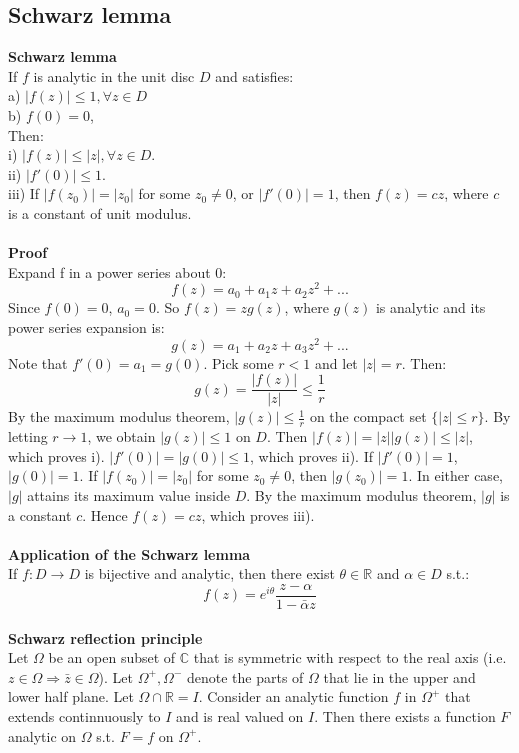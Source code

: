 \documentclass[12 pt]{article}
\begin{document}
\subsection{Schwarz lemma}

\textbf{Schwarz lemma}
\\
If $f$ is analytic in the unit disc $D$ and satisfies:
\\
a) $|f(z)|\leq 1, \forall z\in D$
\\
b) $f(0) = 0$,
\\
Then:
\\
i) $|f(z)|\leq |z|, \forall z\in D$.
\\
ii) $|f'(0)|\leq 1$.
\\
iii) If $|f(z_0)| = |z_0|$ for some $z_0\neq 0$, or $|f'(0)| = 1$, then $f(z)=cz$, where $c$ is a constant of unit modulus.
\\
\\
\textbf{Proof}
\\
Expand f in a power series about 0:
\[ f(z) = a_0 + a_1 z + a_2 z^2 + ... \]
Since $f(0)=0$, $a_0=0$. So $f(z) = z g(z)$, where $g(z)$ is analytic and its power series expansion is:
\[ g(z) = a_1 + a_2 z + a_3 z^2 + ... \]
Note that $f'(0) = a_1 = g(0)$. Pick some $r< 1$ and let $|z| = r$. Then:
\[ g(z) = \frac{|f(z)|}{|z|} \leq \frac{1}{r} \]
By the maximum modulus theorem, $|g(z)| \leq \frac{1}{r}$ on the compact set $\{|z|\leq r\}$. By letting $r\to 1$, we obtain $|g(z)| \leq 1$ on $D$. Then $|f(z)| = |z||g(z)| \leq |z|$, which proves i). $|f'(0)| = |g(0)| \leq 1$, which proves ii). If $|f'(0)| = 1$, $|g(0)| = 1$. If $|f(z_0)| = |z_0|$ for some $z_0 \neq 0$, then $|g(z_0)| = 1$. In either case, $|g|$ attains its maximum value inside $D$. By the maximum modulus theorem, $|g|$ is a constant $c$. Hence $f(z) = cz$, which proves iii).
\\
\\
\textbf{Application of the Schwarz lemma}
\\
If $f:D\to D$ is bijective and analytic, then there exist $\theta \in \mathbb{R}$ and $\alpha \in D$ s.t.:
\[ f(z) = e^{i\theta} \frac{z-\alpha}{1-\bar \alpha z} \]
\\
\textbf{Schwarz reflection principle}
\\
Let $\Omega$ be an open subset of $\mathbb{C}$ that is symmetric with respect to the real axis (i.e. $z\in \Omega \Rightarrow \bar z\in \Omega$). Let $\Omega^{+}, \Omega^{-}$ denote the parts of $\Omega$ that lie in the upper and lower half plane. Let $\Omega \cap \mathbb{R} = I$. Consider an analytic function $f$ in $\Omega^{+}$ that extends continnuously to $I$ and is real valued on $I$. Then there exists a function $F$ analytic on $\Omega$ s.t. $F=f$ on $\Omega^{+}$.
\end{document}
